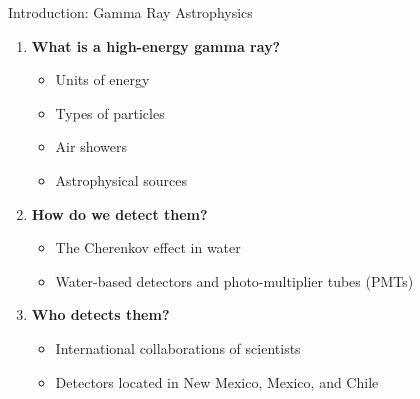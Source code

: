 \documentclass{beamer}
\begin{document}
\begin{frame}{Introduction: Gamma Ray Astrophysics}
\begin{enumerate}
\item \textbf{What is a high-energy gamma ray?}
\begin{itemize}
\item Units of energy
\item Types of particles
\item Air showers
\item Astrophysical sources
\end{itemize}
\item \textbf{How do we detect them?}
\begin{itemize}
\item The Cherenkov effect in water
\item Water-based detectors and photo-multiplier tubes (PMTs)
\end{itemize}
\item \textbf{Who detects them?}
\begin{itemize}
\item International collaborations of scientists
\item Detectors located in New Mexico, Mexico, and Chile
\end{itemize}
\end{enumerate}
\end{frame}
\end{document}
